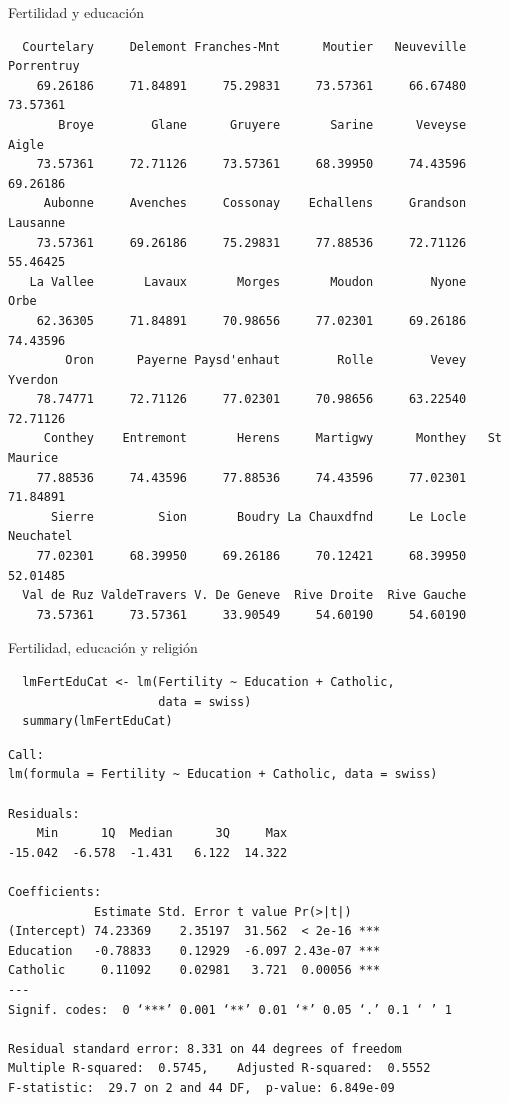 \documentclass[xcolor={usenames,svgnames,dvipsnames}]{beamer}
\begin{document}
\begin{frame}[fragile,label=sec-3-2]{Fertilidad y educación}
\begin{verbatim}
  Courtelary     Delemont Franches-Mnt      Moutier   Neuveville   Porrentruy 
    69.26186     71.84891     75.29831     73.57361     66.67480     73.57361 
       Broye        Glane      Gruyere       Sarine      Veveyse        Aigle 
    73.57361     72.71126     73.57361     68.39950     74.43596     69.26186 
     Aubonne     Avenches     Cossonay    Echallens     Grandson     Lausanne 
    73.57361     69.26186     75.29831     77.88536     72.71126     55.46425 
   La Vallee       Lavaux       Morges       Moudon        Nyone         Orbe 
    62.36305     71.84891     70.98656     77.02301     69.26186     74.43596 
        Oron      Payerne Paysd'enhaut        Rolle        Vevey      Yverdon 
    78.74771     72.71126     77.02301     70.98656     63.22540     72.71126 
     Conthey    Entremont       Herens     Martigwy      Monthey   St Maurice 
    77.88536     74.43596     77.88536     74.43596     77.02301     71.84891 
      Sierre         Sion       Boudry La Chauxdfnd     Le Locle    Neuchatel 
    77.02301     68.39950     69.26186     70.12421     68.39950     52.01485 
  Val de Ruz ValdeTravers V. De Geneve  Rive Droite  Rive Gauche 
    73.57361     73.57361     33.90549     54.60190     54.60190
\end{verbatim}
\end{frame}

\begin{frame}[fragile,label=sec-3-3]{Fertilidad, educación y religión}
 \lstset{language=R,label= ,caption= ,numbers=none}
\begin{lstlisting}
  lmFertEduCat <- lm(Fertility ~ Education + Catholic,
                     data = swiss)
  summary(lmFertEduCat)
\end{lstlisting}

\begin{verbatim}
Call:
lm(formula = Fertility ~ Education + Catholic, data = swiss)

Residuals:
    Min      1Q  Median      3Q     Max 
-15.042  -6.578  -1.431   6.122  14.322 

Coefficients:
            Estimate Std. Error t value Pr(>|t|)    
(Intercept) 74.23369    2.35197  31.562  < 2e-16 ***
Education   -0.78833    0.12929  -6.097 2.43e-07 ***
Catholic     0.11092    0.02981   3.721  0.00056 ***
---
Signif. codes:  0 ‘***’ 0.001 ‘**’ 0.01 ‘*’ 0.05 ‘.’ 0.1 ‘ ’ 1

Residual standard error: 8.331 on 44 degrees of freedom
Multiple R-squared:  0.5745,	Adjusted R-squared:  0.5552 
F-statistic:  29.7 on 2 and 44 DF,  p-value: 6.849e-09
\end{verbatim}
\end{frame}
\end{document}
